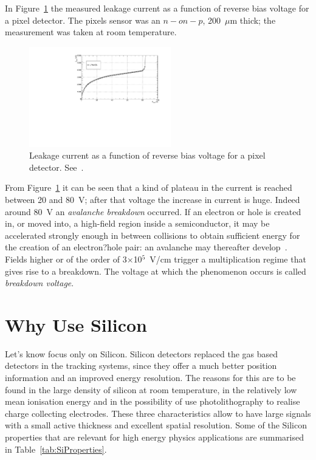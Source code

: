 In Figure~\ref{fig:IV_LPNHE5} the measured leakage current as a function of reverse bias voltage for 
a pixel detector. The pixels sensor was an $n-on-p$, 200~$\mu$m thick; the measurement was 
taken at room temperature.
\begin{figure}
\centering
\includegraphics[width=0.55\textwidth]{IV_LPNHE5.pdf}
\caption{\label{fig:IV_LPNHE5}Leakage current as a function of reverse bias voltage for 
a pixel detector. See~\cite{bib:nim2012,2013arXiv1311.1628B}.}
\end{figure}
From Figure~\ref{fig:IV_LPNHE5} it can be seen that a kind of plateau in the current is reached 
between 20 and 80~V; after that voltage the increase in current is huge. Indeed around 80~V 
an {\it avalanche breakdown} occurred. If an electron or hole is created in, or moved into, a high-field 
region inside a semiconductor, it may be accelerated strongly enough in between collisions to obtain 
sufficient energy for the creation of an electron?hole pair: an avalanche may thereafter 
develop~\cite{Lutz:411172}.
Fields higher or of the order of 3$\times$10$^5$~V/cm trigger a multiplication regime that gives rise to a 
breakdown. The voltage at which the phenomenon occurs is called {\it breakdown voltage}.

\section{Why Use Silicon}
\label{sec:Silicon}
Let's know focus only on Silicon. Silicon detectors replaced the  gas based detectors in the tracking systems, since they offer a much
 better position information and an improved energy resolution. The reasons for this are to be found 
in the large density of silicon at room temperature, in the relatively low mean ionisation energy and 
in the possibility of use photolithography to realise charge collecting electrodes. 
These three characteristics allow to have large signals with a small active thickness and 
excellent spatial resolution. Some of the Silicon properties that are relevant for high energy 
physics applications are summarised in Table~\ref{tab:SiProperties}.


